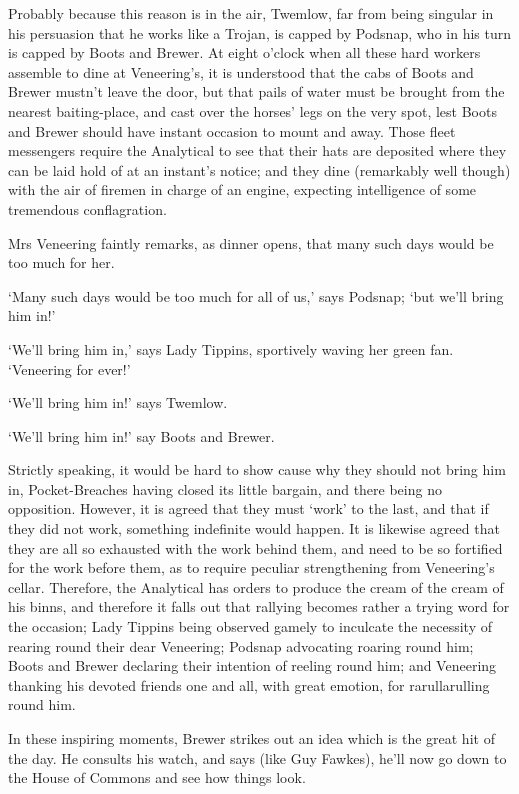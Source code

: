Probably because this reason is in the air, Twemlow, far from being
singular in his persuasion that he works like a Trojan, is capped by
Podsnap, who in his turn is capped by Boots and Brewer. At eight o’clock
when all these hard workers assemble to dine at Veneering’s, it is
understood that the cabs of Boots and Brewer mustn’t leave the door, but
that pails of water must be brought from the nearest baiting-place,
and cast over the horses’ legs on the very spot, lest Boots and Brewer
should have instant occasion to mount and away. Those fleet messengers
require the Analytical to see that their hats are deposited where they
can be laid hold of at an instant’s notice; and they dine (remarkably
well though) with the air of firemen in charge of an engine, expecting
intelligence of some tremendous conflagration.

Mrs Veneering faintly remarks, as dinner opens, that many such days
would be too much for her.

‘Many such days would be too much for all of us,’ says Podsnap; ‘but
we’ll bring him in!’

‘We’ll bring him in,’ says Lady Tippins, sportively waving her green
fan. ‘Veneering for ever!’

‘We’ll bring him in!’ says Twemlow.

‘We’ll bring him in!’ say Boots and Brewer.

Strictly speaking, it would be hard to show cause why they should not
bring him in, Pocket-Breaches having closed its little bargain, and
there being no opposition. However, it is agreed that they must ‘work’
to the last, and that if they did not work, something indefinite would
happen. It is likewise agreed that they are all so exhausted with the
work behind them, and need to be so fortified for the work before them,
as to require peculiar strengthening from Veneering’s cellar. Therefore,
the Analytical has orders to produce the cream of the cream of his
binns, and therefore it falls out that rallying becomes rather a trying
word for the occasion; Lady Tippins being observed gamely to inculcate
the necessity of rearing round their dear Veneering; Podsnap advocating
roaring round him; Boots and Brewer declaring their intention of reeling
round him; and Veneering thanking his devoted friends one and all, with
great emotion, for rarullarulling round him.

In these inspiring moments, Brewer strikes out an idea which is the
great hit of the day. He consults his watch, and says (like Guy Fawkes),
he’ll now go down to the House of Commons and see how things look.

